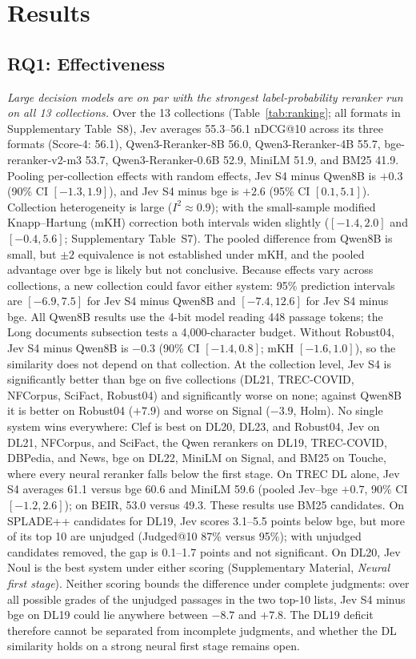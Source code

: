 \section{Results}



\subsection{RQ1: Effectiveness}

\emph{Large decision models are on par with the strongest label-probability reranker run on all 13 collections.}
Over the 13 collections (Table~\ref{tab:ranking}; all formats in Supplementary Table~S8), Jev averages 55.3--56.1 nDCG@10 across its three formats (Score-4: 56.1), Qwen3-Reranker-8B 56.0, Qwen3-Reranker-4B 55.7, bge-reranker-v2-m3 53.7, Qwen3-Reranker-0.6B 52.9, MiniLM 51.9, and BM25 41.9.
Pooling per-collection effects with random effects, Jev S4 minus Qwen8B is $+0.3$ (90\% CI $[-1.3,1.9]$), and Jev S4 minus bge is $+2.6$ (95\% CI $[0.1,5.1]$). Collection heterogeneity is large ($I^2\approx0.9$); with the small-sample modified Knapp--Hartung (mKH) correction both intervals widen slightly ($[-1.4,2.0]$ and $[-0.4,5.6]$; Supplementary Table~S7). The pooled difference from Qwen8B is small, but $\pm2$ equivalence is not established under mKH, and the pooled advantage over bge is likely but not conclusive. Because effects vary across collections, a new collection could favor either system: 95\% prediction intervals are $[-6.9,7.5]$ for Jev S4 minus Qwen8B and $[-7.4,12.6]$ for Jev S4 minus bge. All Qwen8B results use the 4-bit model reading 448 passage tokens; the Long documents subsection tests a 4{,}000-character budget. Without Robust04, Jev S4 minus Qwen8B is $-0.3$ (90\% CI $[-1.4,0.8]$; mKH $[-1.6,1.0]$), so the similarity does not depend on that collection.
At the collection level, Jev S4 is significantly better than bge on five collections (DL21, TREC-COVID, NFCorpus, SciFact, Robust04) and significantly worse on none; against Qwen8B it is better on Robust04 ($+7.9$) and worse on Signal ($-3.9$, Holm). No single system wins everywhere: Clef is best on DL20, DL23, and Robust04, Jev on DL21, NFCorpus, and SciFact, the Qwen rerankers on DL19, TREC-COVID, DBPedia, and News, bge on DL22, MiniLM on Signal, and BM25 on Touche, where every neural reranker falls below the first stage.
On TREC DL alone, Jev S4 averages 61.1 versus bge 60.6 and MiniLM 59.6 (pooled Jev--bge $+0.7$, 90\% CI $[-1.2,2.6]$); on BEIR, 53.0 versus 49.3. These results use BM25 candidates. On SPLADE++\cite{formal2022spladepp} candidates for DL19, Jev scores 3.1--5.5 points below bge, but more of its top 10 are unjudged (Judged@10 87\% versus 95\%); with unjudged candidates removed, the gap is 0.1--1.7 points and not significant. On DL20, Jev Noul is the best system under either scoring (Supplementary Material, \emph{Neural first stage}). Neither scoring bounds the difference under complete judgments: over all possible grades of the unjudged passages in the two top-10 lists, Jev S4 minus bge on DL19 could lie anywhere between $-8.7$ and $+7.8$. The DL19 deficit therefore cannot be separated from incomplete judgments, and whether the DL similarity holds on a strong neural first stage remains open.

